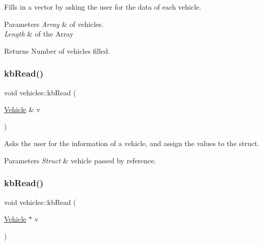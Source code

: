 Fills in a vector by asking the user for the data of each vehicle. 


\begin{DoxyParams}{Parameters}
{\em Array} & of vehicles. \\
\hline
{\em Length} & of the Array \\
\hline
\end{DoxyParams}
\begin{DoxyReturn}{Returns}
Number of vehicles filled. 
\end{DoxyReturn}
\mbox{\label{namespacevehicles_a977739be053b4c9c7a60c7df70c5a248}} 
\subsubsection{\texorpdfstring{kb\+Read()}{kbRead()}\hspace{0.1cm}{\footnotesize\ttfamily [1/2]}}
{\footnotesize\ttfamily void vehicles\+::kb\+Read (\begin{DoxyParamCaption}\item[{\hyperlink{structvehicles_1_1_vehicle}{Vehicle} \&}]{v }\end{DoxyParamCaption})}



Asks the user for the information of a vehicle, and assign the values to the struct. 


\begin{DoxyParams}{Parameters}
{\em Struct} & vehicle passed by reference. \\
\hline
\end{DoxyParams}
\mbox{\label{namespacevehicles_a2300b1362115526825e6628cd2fc5c2e}} 
\subsubsection{\texorpdfstring{kb\+Read()}{kbRead()}\hspace{0.1cm}{\footnotesize\ttfamily [2/2]}}
{\footnotesize\ttfamily void vehicles\+::kb\+Read (\begin{DoxyParamCaption}\item[{\hyperlink{structvehicles_1_1_vehicle}{Vehicle} $\ast$}]{v }\end{DoxyParamCaption})}



